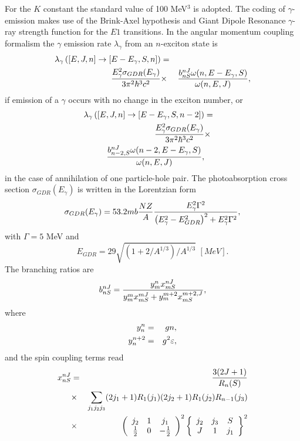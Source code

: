 For the $K$ constant the standard value of 100 MeV$^{3}$ is adopted. The
coding of $\gamma$-emission makes use of the Brink-Axel hypothesis \cite%
{Axel,Brink,Brinka} and Giant Dipole Resonance $\gamma$-ray strength
function for the $E1$ transitions. In the angular momentum coupling
formalism the $\gamma$ emission rate $\lambda_{\gamma}$ from an $n$-exciton
state is
\begin{eqnarray}
\lambda_{\gamma}\left(\left[E,J,n\right]\rightarrow\left[E-E_{\gamma},S,n%
\right]\right)&=& \\
\frac{E_{\gamma}^{2}\sigma_{GDR}(E_{\gamma})}{3\pi^{2}\hbar^{3}c^{2}}&\times&%
\frac{b_{nS}^{nJ}\omega(n,E-E_{\gamma},S)}{\omega(n,E,J)} ,  \notag
\end{eqnarray}
if emission of a $\gamma$ occurs with no change in the exciton number, or
\begin{eqnarray}
\lambda_{\gamma}\left(\left[E,J,n\right]\rightarrow\left[E-E_{\gamma},S,n-2%
\right]\right)&=&  \notag \\
\frac{E_{\gamma}^{2}\sigma_{GDR}(E_{\gamma})}{3\pi^{2}\hbar^{3}c^{2}}&\times&
\notag \\
\frac{b_{n-2,S}^{nJ}\omega(n-2,E-E_{\gamma},S)}{\omega(n,E,J)},&&
\end{eqnarray}
in the case of annihilation of one particle-hole pair. The photoabsorption
cross section $\sigma_{GDR}(E_{\gamma})$ is written in the Lorentzian form
\begin{equation}
\sigma_{GDR}(E_{\gamma})=53.2mb\frac{NZ}{A}\frac{E_{\gamma}^{2}\Gamma^{2}}{%
\left(E_{\gamma}^{2}-E_{GDR}^{2}\right)^{2}+E_{\gamma}^{2}\Gamma^{2}},
\end{equation}
with $\Gamma=5$ MeV and
\begin{equation}
E_{GDR}=29\sqrt{\left(1+2/A^{1/3}\right)/A^{1/3}}\,\,[MeV].
\end{equation}
The branching ratios are
\begin{equation}
b_{nS}^{nJ}=\frac{y_{m}^{n}x_{mS}^{nJ}}{%
y_{m}^{m}x_{mS}^{mJ}+y_{m}^{m+2}x_{mS}^{m+2,J}},
\end{equation}
\noindent where
\begin{eqnarray}
y_{n}^{n} & = & gn,  \notag \\
y_{n}^{n+2} & = & g^{2}\varepsilon,
\end{eqnarray}
and the spin coupling terms read
\begin{eqnarray}
x_{nS}^{nJ} & = & \frac{3(2J+1)}{R_{n}(S)}  \notag \\
& \times
&\sum_{j_{1}j_{2}j_{3}}(2j_{1}+1)R_{1}(j_{1})(2j_{2}+1)R_{1}(j_{2})R_{n-1}(j_{3})
\notag \\
& \times & \left(%
\begin{array}{ccc}
j_{2} & 1 & j_{1} \\
\frac{1}{2} & 0 & -\frac{1}{2}%
\end{array}%
\right)^{2}\left\{
\begin{array}{ccc}
j_{2} & j_{3} & S \\
J & 1 & j_{1}%
\end{array}%
\right\} ^{2}
\end{eqnarray}
